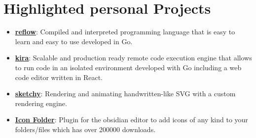 \documentclass[letterpaper,11pt]{article}
\newcommand{\resumeItem}[2]{
  \item\small{
    \textbf{#1}{: #2}
  }
}
\newcommand{\resumeSubItem}[2]{\resumeItem{#1}{#2}}
\newcommand{\resumeSubHeadingListStart}{\begin{itemize}[leftmargin=*]}
\newcommand{\resumeSubHeadingListEnd}{\end{itemize}}
\begin{document}
\section{Highlighted personal Projects}
  \resumeSubHeadingListStart
    \resumeSubItem{\href{https://github.com/FlorianWoelki/reflow}{reflow}}
      {Compiled and interpreted programming language that is easy to learn and easy to use developed in Go.}
      \vspace{-5pt}
    \resumeSubItem{\href{https://github.com/FlorianWoelki/kira}{kira}}
      {Scalable and production ready remote code execution engine that allows to run code in an isolated environment developed with Go including a web code editor written in React.}
      \vspace{-5pt}
    \resumeSubItem{\href{https://sketchy-virid.vercel.app/}{sketchy}}
      {Rendering and animating handwritten-like SVG with a custom rendering engine.}
      \vspace{-5pt}
    \resumeSubItem{\href{https://github.com/FlorianWoelki/obsidian-icon-folder}{Icon Folder}}
      {Plugin for the obsidian editor to add icons of any kind to your folders/files which has over 200000 downloads.}
      \vspace{-5pt}
  \resumeSubHeadingListEnd


\end{document}
